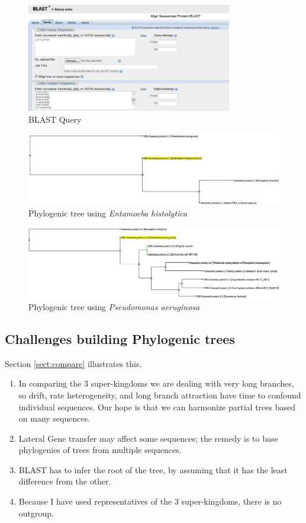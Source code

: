 \documentclass[]{article}
\begin{document}
\begin{figure}[H]
	\caption{BLAST Query}\label{fig:BLAST1}
	\includegraphics[width=0.8\textwidth]{BLAST1}
\end{figure}

\begin{figure}[H]
	\caption{Phylogenic tree using \textit{Entamoeba histolytica}}
	\label{fig:Phylo3}
	\includegraphics[width=\textwidth]{Phylo3}
\end{figure}

\begin{figure}[H]
	\caption{Phylogenic tree using \textit{Pseudomonas aeruginosa}}
	\label{fig:Phylo4}
	\includegraphics[width=\textwidth]{Phylo4}
\end{figure}

\subsection{Challenges building Phylogenic trees}

Section \ref{sect:compare} illustrates this.
\begin{enumerate}
	\item  In comparing the 3 super-kingdoms we are dealing with very long branches, so drift, rate heterogeneity, and long branch attraction have time to confound individual sequences. Our hope is that we can harmonize partial trees based on many sequences.
	\item Lateral Gene transfer may affect some sequences; the remedy is to base phylogenies of trees from multiple sequences.
	\item BLAST has to infer the root of the tree, by assuming that it has the least difference from the other.
	\item Because I have used representatives of the 3 super-kingdoms, there is no outgroup.
\end{enumerate}


\printglossaries




\end{document}
